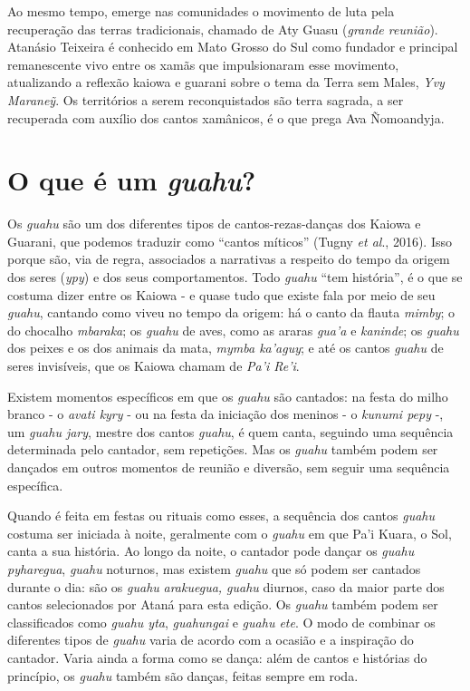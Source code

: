 Ao mesmo tempo, emerge nas comunidades o movimento de luta pela
recuperação das terras tradicionais, chamado de Aty Guasu (\emph{grande
reunião}). Atanásio Teixeira é conhecido em Mato Grosso do Sul como
fundador e principal remanescente vivo entre os xamãs que impulsionaram
esse movimento, atualizando a reflexão kaiowa e guarani sobre o tema da
Terra sem Males, \emph{Yvy Maraneỹ}. Os territórios a serem
reconquistados são terra sagrada, a ser recuperada com auxílio dos
cantos xamânicos, é o que prega Ava Ñomoandyja.

\section{O que é um \emph{guahu}?}

Os \emph{guahu} são um dos diferentes tipos de cantos-rezas-danças dos
Kaiowa e Guarani, que podemos traduzir como ``cantos míticos'' (Tugny
\emph{et al}., 2016). Isso porque são, via de regra, associados a
narrativas a respeito do tempo da origem dos seres (\emph{ypy}) e dos
seus comportamentos. Todo \emph{guahu} ``tem história'', é o que se
costuma dizer entre os Kaiowa - e quase tudo que existe fala por meio de
seu \emph{guahu}, cantando como viveu no tempo da origem: há o canto da
flauta \emph{mimby}; o do chocalho \emph{mbaraka}; os \emph{guahu} de
aves, como as araras \emph{gua'a} e \emph{kaninde}; os \emph{guahu} dos
peixes e os dos animais da mata, \emph{mymba ka'aguy}; e até os cantos
\emph{guahu} de seres invisíveis, que os Kaiowa chamam de \emph{Pa'i
Re'i}.

Existem momentos específicos em que os \emph{guahu} são cantados: na
festa do milho branco - o \emph{avati kyry} - ou na festa da iniciação
dos meninos - o \emph{kunumi pepy} -, um \emph{guahu jary}, mestre dos
cantos \emph{guahu}, é quem canta, seguindo uma sequência determinada
pelo cantador, sem repetições. Mas os \emph{guahu} também podem ser
dançados em outros momentos de reunião e diversão, sem seguir uma
sequência específica.

Quando é feita em festas ou rituais como esses, a sequência dos cantos
\emph{guahu} costuma ser iniciada à noite, geralmente com o \emph{guahu}
em que Pa'i Kuara, o Sol, canta a sua história. Ao longo da noite, o
cantador pode dançar os \emph{guahu pyharegua}, \emph{guahu} noturnos,
mas existem \emph{guahu} que só podem ser cantados durante o dia: são os
\emph{guahu} \emph{arakuegua, guahu} diurnos, caso da maior parte dos
cantos selecionados por Ataná para esta edição. Os \emph{guahu} também
podem ser classificados como \emph{guahu yta}, \emph{guahungai} e
\emph{guahu ete}. O modo de combinar os diferentes tipos de \emph{guahu}
varia de acordo com a ocasião e a inspiração do cantador. Varia ainda a
forma como se dança: além de cantos e histórias do princípio, os
\emph{guahu} também são danças, feitas sempre em roda.

